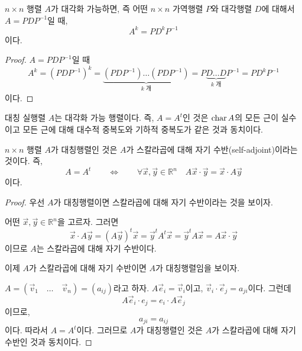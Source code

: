 \documentclass[sections/engineering_mathematics_lecture_note.tex]{subfiles}
\begin{document}
\begin{theorem}
    $n \times n$ 행렬 $A$가 대각화 가능하면, 즉 어떤 $n \times n$ 가역행렬 $P$와 대각행렬 $D$에 대해서 $A = PDP^{-1}$일 때,
    \begin{equation*}
        A^k = PD^k P^{-1}
    \end{equation*}
    이다.
\end{theorem}

\begin{proof}
    $A = PDP^{-1}$일 때
    \begin{equation*}
        A^k = (PDP^{-1})^k = \underbrace{(PDP^{-1}) \dots (PDP^{-1})}_\text{$k$ 개} = P\underbrace{D\dots D}_\text{$k$ 개}P^{-1} = PD^kP^{-1}
    \end{equation*}
    이다.
\end{proof}

\begin{theorem}
    대칭 실행렬 $A$는 대각화 가능 행렬이다.
    즉, $A = A^t$인 것은 $\operatorname{char} A$의 모든 근이 실수이고 모든 근에 대해 대수적 중복도와 기하적 중복도가 같은 것과 동치이다.
\end{theorem}

\begin{lemma} \label{lem:self_adjoint_sym}
    $n \times n$ 행렬 $A$가 대칭행렬인 것은 $A$가 스칼라곱에 대해 자기 수반(self-adjoint)이라는 것이다.
    즉,
    \begin{equation*}
        A = A^t \qquad \Longleftrightarrow \qquad \forall \vec x, \vec y \in \mathbb R^n \quad A\vec x \cdot \vec y = \vec x \cdot A \vec y
    \end{equation*}
    이다.
\end{lemma}

\begin{proof}
    우선 $A$가 대칭행렬이면 스칼라곱에 대해 자기 수반이라는 것을 보이자.

    어떤 $\vec x, \vec y \in \mathbb R^n$을 고르자.
    그러면
    \begin{equation*}
        \vec x \cdot A \vec y = (A\vec y)^t \vec x = \vec y^t A^t \vec x = \vec y^t A \vec x = A \vec x \cdot \vec y
    \end{equation*}
    이므로 $A$는 스칼라곱에 대해 자기 수반이다.

    이제 $A$가 스칼라곱에 대해 자기 수반이면 $A$가 대칭행렬임을 보이자.

    $A = (\vec v_1 \quad \dots \quad \vec v_n) = (a_{ij})$라고 하자.
    $A \vec e_i = \vec v_i$이고, $\vec v_i \cdot \vec e_j = a_{ji}$이다.
    그런데
    \begin{equation*}
        A \vec e_i \cdot e_j = e_i \cdot A \vec e_j
    \end{equation*}
    이므로,
    \begin{equation*}
        a_{ji} = a_{ij}
    \end{equation*}
    이다.
    따라서 $A = A^t$이다.
    그러므로 $A$가 대칭행렬인 것은 $A$가 스칼라곱에 대해 자기 수반인 것과 동치이다.
\end{proof}
\end{document}
